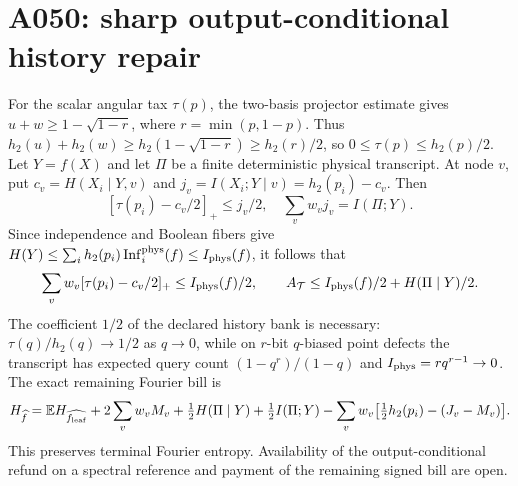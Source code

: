 \documentclass{article}
\begin{document}
\section*{A050: sharp output-conditional history repair}
For the scalar angular tax $\tau(p)$, the two-basis projector estimate gives
$u+w\ge1-\sqrt{1-r}$, where $r=\min(p,1-p)$. Thus
$h_2(u)+h_2(w)\ge h_2(1-\sqrt{1-r})\ge h_2(r)/2$,
so $0\le\tau(p)\le h_2(p)/2$.
Let $Y=f(X)$ and let $\Pi$ be a finite deterministic physical transcript.
At node $v$, put $c_v=H(X_i\mid Y,v)$ and
$j_v=I(X_i;Y\mid v)=h_2(p_i)-c_v$.
Then
\[
 [\tau(p_i)-c_v/2]_+\le j_v/2,
 \quad \sum_vw_vj_v=I(\Pi;Y).
\]
Since independence and Boolean fibers give
$H(Y)\le\sum_i h_2(p_i)\operatorname{Inf}_i^{\rm phys}(f)
\le I_{\rm phys}(f)$, it follows that
\[
 \sum_v w_v[\tau(p_i)-c_v/2]_+\le I_{\rm phys}(f)/2,
 \qquad A_{\mathcal T}\le I_{\rm phys}(f)/2+H(\Pi\mid Y)/2.
\]
The coefficient $1/2$ of the declared history bank is necessary:
$\tau(q)/h_2(q)\to1/2$ as $q\to0$, while on $r$-bit $q$-biased point
defects the transcript has expected query count $(1-q^r)/(1-q)$ and
$I_{\rm phys}=rq^{r-1}\to0$.
The exact remaining Fourier bill is
\[
H_{\widehat f}=\mathbb E H_{\widehat {f_{\rm leaf}}}
+2\sum_vw_vM_v+\tfrac12H(\Pi\mid Y)+\tfrac12I(\Pi;Y)
-\sum_vw_v\bigl[\tfrac12h_2(p_i)-(J_v-M_v)\bigr].
\]
This preserves terminal Fourier entropy. Availability of the output-conditional
refund on a spectral reference and payment of the remaining signed bill are open.
\end{document}
